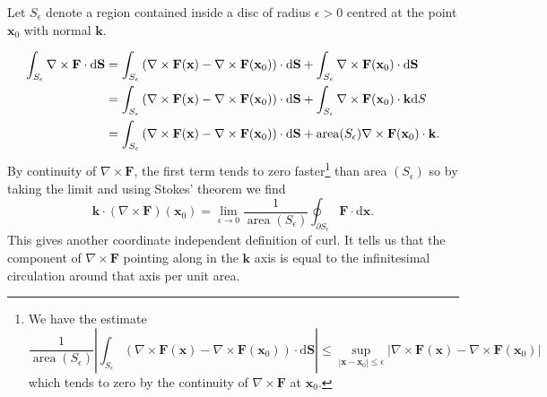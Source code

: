 \begin{example}
    Let $ S_\epsilon $ denote a region contained inside a disc of radius $ \epsilon>0 $ centred at the point $\mathbf{x}_0$ with normal $\mathbf{k}$.
    \begin{center}
    \end{center}
    \begin{align*}
        \int_{S_\epsilon} \nabla\times\mathbf{F} \cdot\mathrm{d}\mathbf{S} &= \int_{S_\epsilon}\left( \nabla\times\mathbf{F}(\mathbf{x})-\nabla\times\mathbf{F}(\mathbf{x}_0) \right)\cdot\mathrm{d}\mathbf{S}+\int_{S_\epsilon}\nabla\times\mathbf{F}(\mathbf{x}_0)\cdot\mathrm{d}\mathbf{S}\\ 
        &= \int_{S_\epsilon}\left( \nabla\times\mathbf{F}(\mathbf{x})-\nabla\times\mathbf{F}(\mathbf{x}_0) \right)\cdot\mathrm{d}\mathbf{S}+\int_{S_\epsilon}\nabla\times\mathbf{F}(\mathbf{x}_0)\cdot \mathbf{k}\dd S\\ 
        &= \int_{S_\epsilon}\left( \nabla\times\mathbf{F}(\mathbf{x})-\nabla\times\mathbf{F}(\mathbf{x}_0) \right)\cdot\mathrm{d}\mathbf{S}+ \operatorname{area}(S_\epsilon) \nabla\times\mathbf{F}(\mathbf{x}_0)\cdot \mathbf{k}.
    \end{align*}
    By continuity of $\nabla \times \mathbf{F}$, the first term tends to zero faster\footnote{We have the estimate
    \[
    \frac{1}{\operatorname{area}\left(S_{\epsilon}\right)}\left|\int_{S_{\epsilon}}\left(\nabla \times \mathbf{F}(\mathbf{x})-\nabla \times \mathbf{F}\left(\mathbf{x}_{0}\right)\right) \cdot \mathrm{d} \mathbf{S}\right| \leq \sup _{\left|\mathbf{x}-\mathbf{x}_{0}\right| \leq \epsilon}\left|\nabla \times \mathbf{F}(\mathbf{x})-\nabla \times \mathbf{F}\left(\mathbf{x}_{0}\right)\right|
    \]
    which tends to zero by the continuity of $\nabla \times \mathbf{F}$ at $\mathbf{x}_{0}$.} than area $\left(S_{\epsilon}\right)$ so by taking
    the limit and using Stokes' theorem we find
    \[
    \mathbf{k} \cdot(\nabla \times \mathbf{F})\left(\mathbf{x}_{0}\right)=\lim _{\epsilon \rightarrow 0} \frac{1}{\operatorname{area}\left(S_{\epsilon}\right)} \oint_{\partial S_{\epsilon}} \mathbf{F} \cdot \mathrm{d} \mathbf{x}.
    \]
    This gives another coordinate independent definition of curl. It tells us that the component of $\nabla \times \mathbf{F}$ pointing along in the $\mathbf{k}$ axis is equal to the infinitesimal circulation around that axis per unit area.
\end{example}
